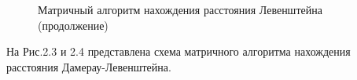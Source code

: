 \documentclass[a4paper,12pt]{report}
\begin{document}
\begin{figure}[ht!]
\caption{Матричный алгоритм нахождения расстояния Левенштейна (продолжение)}
\end{figure}
\newpage
На Рис.2.3 и 2.4 представлена схема матричного алгоритма нахождения расстояния Дамерау-Левенштейна.
\end{document}
